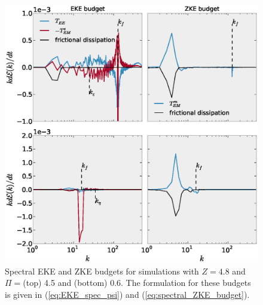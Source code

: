 \documentclass{jfm}
\begin{document}
\begin{figure}
\begin{center}
\includegraphics[width=6in]{EKE_ZKE_budget_drag8e-4}\caption{Spectral EKE and ZKE budgets for simulations with $Z=4.8$ and $\Pi=$(top)
4.5 and (bottom) 0.6. The formulation for these budgets is given
in (\ref{eq:EKE_spec_psi}) and (\ref{eq:spectral_ZKE_budget}).}
\label{EKE_ZKE_spectral_budget_drag8e-4}
\end{center}
\end{figure}

\end{document}
